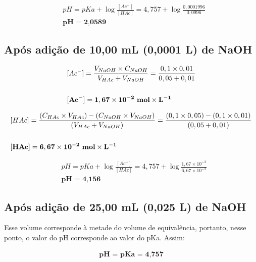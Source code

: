\documentclass[a4paper, 12pt]{article}
\begin{document}
\begin{fleqn}
	\begin{align*}
		& pH = pKa + \log \frac{[Ac^{-}]}{[HAc]} = 4,757 + \log \frac{0,0001996}{0,0996} \\
		& \textbf{pH = 2,0589}
	\end{align*}
\end{fleqn}

\subsection{Após adição de 10,00 mL (0,0001 L) de NaOH}
\begin{fleqn}
	\begin{align*}
		& [Ac^{-}] = \frac{ V_{NaOH} \times C_{NaOH} }{ V_{HAc} + V_{NaOH} } = \frac{0,1 \times 0,01}{0,05 + 0,01} \\ \\
		& \mathbf{[Ac^{-}] = 1,67 \times 10^{-2} \text{ \textbf{mol}} \times L^{-1}}
	\end{align*}
\end{fleqn}

\begin{fleqn}
	\begin{align*}
		& [HAc] = \frac{ (C_{HAc} \times V_{HAc}) - (C_{NaOH} \times V_{NaOH}) }{ (V_{HAc} + V_{NaOH}) } = \frac{ (0,1 \times 0,05) - (0,1 \times 0,01) }{ (0,05 + 0,01) }\\ \\
		& \mathbf{[HAc] = 6,67 \times 10^{-2} \text{ \textbf{mol}} \times L^{-1}}
	\end{align*}
\end{fleqn}

\begin{fleqn}
	\begin{align*}
		& pH = pKa + \log \frac{[Ac^{-}]}{[HAc]} = 4,757 + \log \frac{1,67 \times 10^{-2}}{6,67 \times 10^{-2}} \\
		& \textbf{pH = 4,156}
	\end{align*}
\end{fleqn}

\subsection{Após adição de 25,00 mL (0,025 L) de NaOH}
Esse volume corresponde à metade do volume de equivalência, portanto, nesse ponto, o valor do pH corresponde ao valor do pKa. Assim:

\begin{fleqn}
	\begin{align*}
		 \textbf{pH = pKa = 4,757}
	\end{align*}
\end{fleqn}
\end{document}
